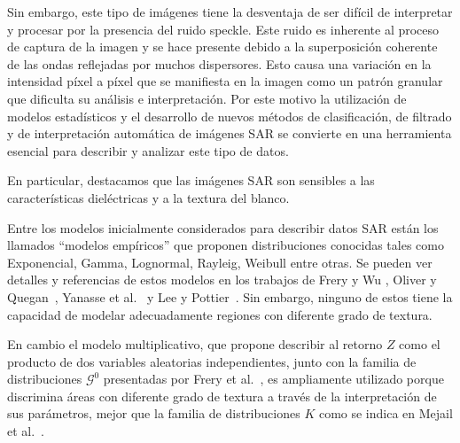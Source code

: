 \documentclass[11pt]{article}
\begin{document}
Sin embargo, este tipo de imágenes tiene la desventaja de ser difícil de interpretar y procesar por la presencia del ruido speckle. 
Este ruido es inherente al proceso de captura de la imagen y se hace presente debido a la superposición coherente de las ondas reflejadas por muchos dispersores. Esto causa una variación en la intensidad píxel a píxel que se manifiesta en la imagen como un patrón granular que dificulta su análisis e interpretación. 
Por este motivo la utilización de modelos estadísticos y el desarrollo de nuevos métodos de clasificación, de filtrado y de interpretación automática de imágenes SAR se convierte en una herramienta esencial para describir y analizar este tipo de datos.

En particular, destacamos que las imágenes SAR son sensibles a las características dieléctricas y a la textura del blanco.

Entre los modelos inicialmente considerados para describir datos SAR están los llamados ``modelos empíricos'' que proponen distribuciones conocidas tales como Exponencial, Gamma, Lognormal, Rayleig, Weibull entre otras. Se pueden ver detalles y referencias de estos modelos en los trabajos de Frery y Wu \cite{FreryLibro2019}, Oliver y Quegan~\cite{oliverquegan98}, Yanasse et al.~\cite{Yanasse93} y Lee y Pottier~\cite{Lee2009}. 
Sin embargo, ninguno de estos tiene la capacidad de modelar adecuadamente regiones con diferente grado de textura.
%

En cambio el modelo multiplicativo, que propone describir al retorno $Z$ como el producto de dos variables aleatorias independientes, junto con la familia de distribuciones $\mathcal{G}^0$ presentadas por Frery et al.~\cite{Frery97}, es ampliamente utilizado porque discrimina áreas con diferente grado de textura a través de la interpretación de sus parámetros, mejor que la familia de distribuciones $K$ como se indica en Mejail et al.~\cite{MejailJacoboFreryBustos:IJRS}.

\end{document}
